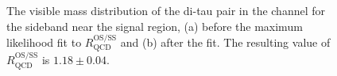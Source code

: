 \begin{figure}[h!]
\begin{center}
\end{center}
\caption[The visible mass distribution of the di-tau pair
in the \mutau channel for the sideband near the signal region, before
and after the maximum likelihood fit to $R_{\text{QCD}}^{\text{OS/SS}}$.]{The visible mass distribution of the di-tau pair in the \mutau channel for the sideband near the signal region, (a) before
the maximum likelihood fit to $R_{\text{QCD}}^{\text{OS/SS}}$ and (b) after the fit. The resulting value of $R_{\text{QCD}}^{\text{OS/SS}}$
is $1.18\pm0.04$.}
\label{fig:mssm_qcdosss_mtnear}
\end{figure}

